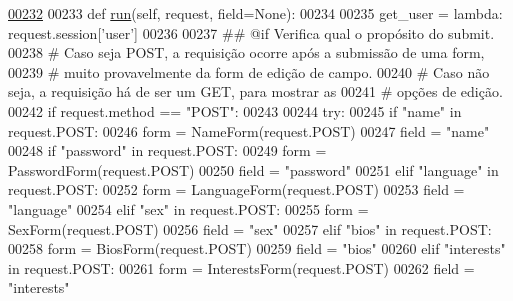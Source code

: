 \begin{DoxyCode}
\hypertarget{classProfile_1_1ProfileUnit_1_1UiFullProfile_l00232}{}\hyperlink{classProfile_1_1ProfileUnit_1_1UiFullProfile_a7a7747246b627020a345f7a3eac27778}{00232} 
00233     \textcolor{keyword}{def }\hyperlink{classProfile_1_1ProfileUnit_1_1UiFullProfile_a7a7747246b627020a345f7a3eac27778}{run}(self, request, field=None):
00234 
00235         get\_user = \textcolor{keyword}{lambda}: request.session[\textcolor{stringliteral}{'user'}]
00236 
00237         \textcolor{comment}{## @if Verifica qual o propósito do submit.}
00238         \textcolor{comment}{#   Caso seja POST, a requisição ocorre após a submissão de uma form,}
00239         \textcolor{comment}{#       muito provavelmente da form de edição de campo.}
00240         \textcolor{comment}{#   Caso não seja, a requisição há de ser um GET, para mostrar as}
00241         \textcolor{comment}{#       opções de edição.}
00242         \textcolor{keywordflow}{if} request.method == \textcolor{stringliteral}{"POST"}:
00243 
00244             \textcolor{keywordflow}{try}:
00245                 \textcolor{keywordflow}{if}   \textcolor{stringliteral}{"name"} \textcolor{keywordflow}{in} request.POST:
00246                     form = NameForm(request.POST)
00247                     field = \textcolor{stringliteral}{"name"}
00248                 \textcolor{keywordflow}{if}  \textcolor{stringliteral}{"password"} \textcolor{keywordflow}{in} request.POST:
00249                     form = PasswordForm(request.POST)
00250                     field = \textcolor{stringliteral}{"password"}
00251                 \textcolor{keywordflow}{elif} \textcolor{stringliteral}{"language"} \textcolor{keywordflow}{in} request.POST:
00252                     form = LanguageForm(request.POST)
00253                     field = \textcolor{stringliteral}{"language"}
00254                 \textcolor{keywordflow}{elif} \textcolor{stringliteral}{"sex"} \textcolor{keywordflow}{in} request.POST:
00255                     form = SexForm(request.POST)
00256                     field = \textcolor{stringliteral}{"sex"}
00257                 \textcolor{keywordflow}{elif} \textcolor{stringliteral}{"bios"} \textcolor{keywordflow}{in} request.POST:
00258                     form = BiosForm(request.POST)
00259                     field = \textcolor{stringliteral}{"bios"}
00260                 \textcolor{keywordflow}{elif} \textcolor{stringliteral}{"interests"} \textcolor{keywordflow}{in} request.POST:
00261                     form = InterestsForm(request.POST)
00262                     field = \textcolor{stringliteral}{"interests"}

\end{DoxyCode}
